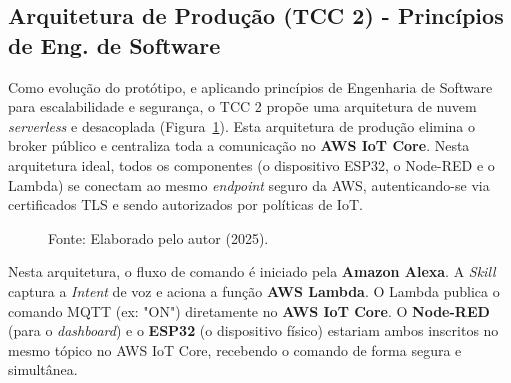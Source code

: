 \subsection{Arquitetura de Produção (TCC 2) - Princípios de Eng. de Software}
\label{sec:arq_tcc2}
Como evolução do protótipo, e aplicando princípios de Engenharia de Software para escalabilidade e segurança, o TCC 2 propõe uma arquitetura de nuvem \textit{serverless} e desacoplada (Figura~\ref{fig:arquitetura_logica_tcc2}).
Esta arquitetura de produção elimina o broker público e centraliza toda a comunicação no \textbf{AWS IoT Core}.
Nesta arquitetura ideal, todos os componentes (o dispositivo ESP32, o Node-RED e o Lambda) se conectam ao mesmo \textit{endpoint} seguro da AWS, autenticando-se via certificados TLS e sendo autorizados por políticas de IoT.
\begin{figure}[H]
    \centering
    \caption{Diagrama da Arquitetura Lógica de Produção (TCC 2) seguindo princípios de Engenharia de Software.}
    \caption*{Fonte: Elaborado pelo autor (2025).}
    \label{fig:arquitetura_logica_tcc2}
\end{figure}

Nesta arquitetura, o 
fluxo de comando é iniciado pela \textbf{Amazon Alexa}. A \textit{Skill} captura a \textit{Intent} de voz e aciona a função \textbf{AWS Lambda}.
O Lambda publica o comando MQTT (ex: "ON") diretamente no \textbf{AWS IoT Core}.
O \textbf{Node-RED} (para o \textit{dashboard}) e o \textbf{ESP32} (o dispositivo físico) estariam ambos inscritos no mesmo tópico no AWS IoT Core, recebendo o comando de forma segura e simultânea.
